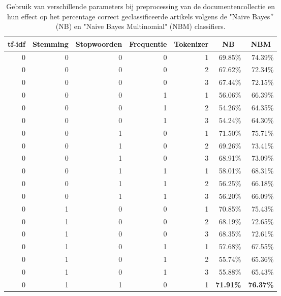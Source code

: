 \begin{longtable}{rrrrrrr}
	\caption{Gebruik van verschillende parameters bij preprocessing van de documentencollectie en hun effect op het percentage correct geclassificeerde artikels volgens de "Naive Bayes$"$ (NB) en "Naive Bayes Multinomial" (NBM) classifiers.}\\
	\toprule
	\multicolumn{1}{c}{\textbf{tf-idf}} & \multicolumn{1}{c}{\textbf{Stemming}} & \multicolumn{1}{c}{\textbf{Stopwoorden}} & \multicolumn{1}{c}{\textbf{Frequentie}} & \multicolumn{1}{c}{\textbf{Tokenizer}} & \multicolumn{1}{c}{\textbf{NB}} & \multicolumn{1}{c}{\textbf{NBM}} \\
	\midrule
	0     & 0     & 0     & 0     & 1     & 69.85\% & 74.39\% \\
	0     & 0     & 0     & 0     & 2     & 67.62\% & 72.34\% \\
	0     & 0     & 0     & 0     & 3     & 67.44\% & 72.15\% \\
	0     & 0     & 0     & 1     & 1     & 56.06\% & 66.39\% \\
	0     & 0     & 0     & 1     & 2     & 54.26\% & 64.35\% \\
	0     & 0     & 0     & 1     & 3     & 54.24\% & 64.30\% \\
	0     & 0     & 1     & 0     & 1     & 71.50\% & 75.71\% \\
	0     & 0     & 1     & 0     & 2     & 69.26\% & 73.41\% \\
	0     & 0     & 1     & 0     & 3     & 68.91\% & 73.09\% \\
	0     & 0     & 1     & 1     & 1     & 58.01\% & 68.31\% \\
	0     & 0     & 1     & 1     & 2     & 56.25\% & 66.18\% \\
	0     & 0     & 1     & 1     & 3     & 56.20\% & 66.09\% \\
	0     & 1     & 0     & 0     & 1     & 70.85\% & 75.43\% \\
	0     & 1     & 0     & 0     & 2     & 68.19\% & 72.65\% \\
	0     & 1     & 0     & 0     & 3     & 68.35\% & 72.61\% \\
	0     & 1     & 0     & 1     & 1     & 57.68\% & 67.55\% \\
	0     & 1     & 0     & 1     & 2     & 55.74\% & 65.36\% \\
	0     & 1     & 0     & 1     & 3     & 55.88\% & 65.43\% \\
	0     & 1     & 1     & 0     & 1     & \textbf{71.91\%} & \textbf{76.37\%} \\

\end{longtable}
